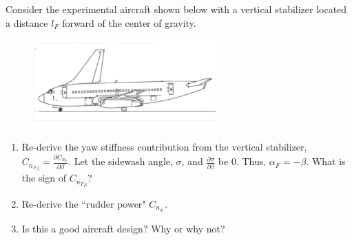 \begin{question}
    Consider the experimental aircraft shown below with a vertical stabilizer located a distance $l_F$ forward of the center of gravity.
    \begin{figure}[h]
        \centering
        \includegraphics[width=0.65\textwidth]{figures/ForwardVStab.png}
    \end{figure}
    \begin{enumerate}
        \item Re-derive the yaw stiffness contribution from the vertical stabilizer, $C_{{n_F}_\beta} = \frac{\partial C_{{n_F}}}{\partial \beta}$. Let the sidewash angle, $\sigma$, and $\frac{\partial \sigma}{\partial \beta}$ be 0. Thus, $\alpha_F = -\beta$. What is the sign of $C_{{n_F}_\beta}$?
        \item Re-derive the ``rudder power" $C_{n_{\delta_r}}$.
        \item Is this a good aircraft design? Why or why not?
    \end{enumerate}
\end{question}
